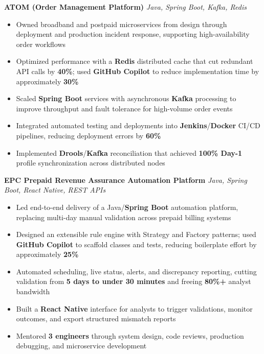 \documentclass[letterpaper,11pt]{article}
\newcommand{\resumeItem}[1]{
  \item\small{{#1 \vspace{-2pt}}}
}
\newcommand{\resumeItemListStart}{\begin{itemize}}
\newcommand{\resumeItemListEnd}{\end{itemize}\vspace{-5pt}}
\begin{document}
      \vspace{4pt}
      \textbf{\small ATOM (Order Management Platform)} \hfill \textit{\small Java, Spring Boot, Kafka, Redis} \\
      \vspace{-2pt}
      \resumeItemListStart
        \resumeItem{Owned broadband and postpaid microservices from design through deployment and production incident response, supporting high-availability order workflows}
        \resumeItem{Optimized performance with a \textbf{Redis} distributed cache that cut redundant API calls by \textbf{40\%}; used \textbf{GitHub Copilot} to reduce implementation time by approximately \textbf{30\%}}
        \resumeItem{Scaled \textbf{Spring Boot} services with asynchronous \textbf{Kafka} processing to improve throughput and fault tolerance for high-volume order events}
        \resumeItem{Integrated automated testing and deployments into \textbf{Jenkins}/\textbf{Docker} CI/CD pipelines, reducing deployment errors by \textbf{60\%}}
        \resumeItem{Implemented \textbf{Drools}/\textbf{Kafka} reconciliation that achieved \textbf{100\% Day-1} profile synchronization across distributed nodes}
      \resumeItemListEnd

      \vspace{4pt}
      \textbf{\small EPC Prepaid Revenue Assurance Automation Platform} \hfill \textit{\small Java, Spring Boot, React Native, REST APIs} \\
      \vspace{-2pt}
      \resumeItemListStart
        \resumeItem{Led end-to-end delivery of a Java/\textbf{Spring Boot} automation platform, replacing multi-day manual validation across prepaid billing systems}
        \resumeItem{Designed an extensible rule engine with Strategy and Factory patterns; used \textbf{GitHub Copilot} to scaffold classes and tests, reducing boilerplate effort by approximately \textbf{25\%}}
        \resumeItem{Automated scheduling, live status, alerts, and discrepancy reporting, cutting validation from \textbf{5 days to under 30 minutes} and freeing \textbf{80\%+} analyst bandwidth}
        \resumeItem{Built a \textbf{React Native} interface for analysts to trigger validations, monitor outcomes, and export structured mismatch reports}
        \resumeItem{Mentored \textbf{3 engineers} through system design, code reviews, production debugging, and microservice development}
      \resumeItemListEnd
\end{document}
